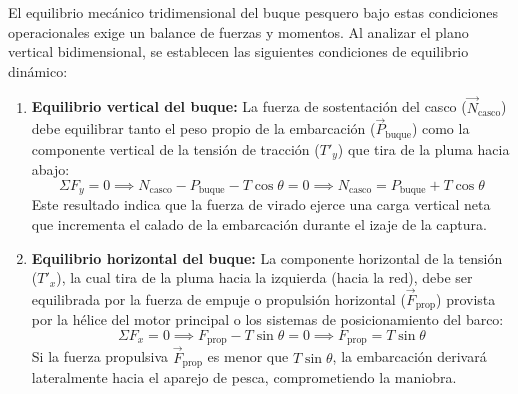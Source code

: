 \documentclass[11pt,a4paper]{article}
\begin{document}
El equilibrio mecánico tridimensional del buque pesquero bajo estas condiciones operacionales exige un balance de fuerzas y momentos. Al analizar el plano vertical bidimensional, se establecen las siguientes condiciones de equilibrio dinámico:
\begin{enumerate}
    \item \textbf{Equilibrio vertical del buque:}
    La fuerza de sostentación del casco ($\vec{N}_{\text{casco}}$) debe equilibrar tanto el peso propio de la embarcación ($\vec{P}_{\text{buque}}$) como la componente vertical de la tensión de tracción ($T'_y$) que tira de la pluma hacia abajo:
    \begin{equation}\label{eq:eq_buque_vertical}
    \Sigma F_y = 0 \implies N_{\text{casco}} - P_{\text{buque}} - T\cos\theta = 0 \implies N_{\text{casco}} = P_{\text{buque}} + T\cos\theta
    \end{equation}
    Este resultado indica que la fuerza de virado ejerce una carga vertical neta que incrementa el calado de la embarcación durante el izaje de la captura.
    
    \item \textbf{Equilibrio horizontal del buque:}
    La componente horizontal de la tensión ($T'_x$), la cual tira de la pluma hacia la izquierda (hacia la red), debe ser equilibrada por la fuerza de empuje o propulsión horizontal ($\vec{F}_{\text{prop}}$) provista por la hélice del motor principal o los sistemas de posicionamiento del barco:
    \begin{equation}\label{eq:eq_buque_horizontal}
    \Sigma F_x = 0 \implies F_{\text{prop}} - T\sin\theta = 0 \implies F_{\text{prop}} = T\sin\theta
    \end{equation}
    Si la fuerza propulsiva $\vec{F}_{\text{prop}}$ es menor que $T\sin\theta$, la embarcación derivará lateralmente hacia el aparejo de pesca, comprometiendo la maniobra.
\end{enumerate}
\end{document}
